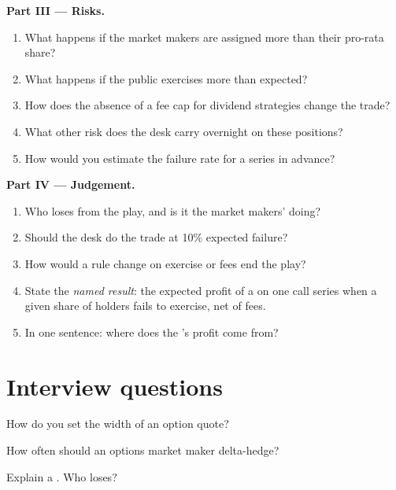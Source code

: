 \begin{problem}
\medskip\noindent\textbf{Part III --- Risks.}
\begin{enumerate}[resume]
\item What happens if the market makers are assigned more than their pro-rata share?
\item What happens if the public exercises more than expected?
\item How does the absence of a fee cap for dividend strategies change the trade?
\item What other risk does the desk carry overnight on these positions?
\item How would you estimate the failure rate for a series in advance?
\end{enumerate}

\medskip\noindent\textbf{Part IV --- Judgement.}
\begin{enumerate}[resume]
\item Who loses from the play, and is it the market makers' doing?
\item Should the desk do the trade at 10\% expected failure?
\item How would a rule change on exercise or fees end the play?
\item State the \emph{named result}: the expected profit of a  on one call series when a given share of holders fails to exercise, net of fees.
\item In one sentence: where does the 's profit come from?
\end{enumerate}
\end{problem}

\section{Interview questions}

\begin{interviewq}\label{iq:dv:options-market-making-in-practice:1}
How do you set the width of an option quote?
\end{interviewq}

\begin{interviewq}\label{iq:dv:options-market-making-in-practice:2}
How often should an options market maker delta-hedge?
\end{interviewq}

\begin{interviewq}\label{iq:dv:options-market-making-in-practice:3}
Explain a . Who loses?
\end{interviewq}

